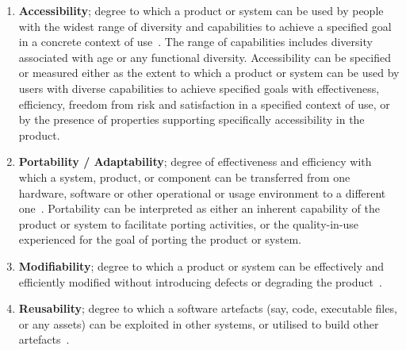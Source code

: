 \begin{enumerate}
    \item \textbf{Accessibility}; degree to which a product or system can be used by people with the widest range of diversity and capabilities to achieve a specified goal in a concrete context of use~\cite{iso_25010_2011_2017}. The range of capabilities includes diversity associated with age or any functional diversity. Accessibility can be specified or measured either as the extent to which a product or system can be used by users with diverse capabilities to achieve specified goals with effectiveness, efficiency, freedom from risk and satisfaction in a specified context of use, or by the presence of properties supporting specifically accessibility in the product.

    \item \textbf{Portability / Adaptability}; degree of effectiveness and efficiency with which a system, product, or component can be transferred from one hardware, software or other operational or usage environment to a different one~\cite{iso_25010_2011_2017}. Portability can be interpreted as either an inherent capability of the product or system to facilitate porting activities, or the quality-in-use experienced for the goal of porting the product or system.

    \item \textbf{Modifiability}; degree to which a product or system can be effectively and efficiently modified without introducing defects or degrading the product~\cite{iso_25010_2011_2017}.

    \item \textbf{Reusability}; degree to which a software artefacts (say, code, executable files, or any assets) can be exploited in other systems, or utilised to build other artefacts~\cite{iso_25010_2011_2017}.


\end{enumerate}
